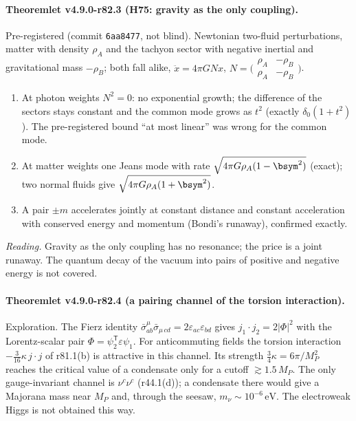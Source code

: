 \paragraph{Theoremlet v4.9.0-r82.3 (H75: gravity as the only coupling).}
Pre-registered (commit \texttt{6aa8477}, not blind).  Newtonian two-fluid perturbations, matter with density \(\rho_A\) and the tachyon
sector with negative inertial and gravitational mass \(-\rho_B\); both fall alike, \(\ddot x=4\pi G N x\),
\(N=\bigl(\begin{smallmatrix}\rho_A&-\rho_B\\\rho_A&-\rho_B\end{smallmatrix}\bigr)\).
\begin{enumerate}[leftmargin=2em]
\item[(a)] At photon weights \(N^2=0\): no exponential growth; the difference of the sectors stays constant and the common mode grows
as \(t^2\) (exactly \(\delta_0(1+t^2)\)).  The pre-registered bound ``at most linear'' was wrong for the common mode.
\item[(b)] At matter weights one Jeans mode with rate \(\sqrt{4\pi G\rho_A(1-\bsym^2)}\) (exact); two normal fluids give
\(\sqrt{4\pi G\rho_A(1+\bsym^2)}\).
\item[(c)] A pair \(\pm m\) accelerates jointly at constant distance and constant acceleration with conserved energy and momentum
(Bondi's runaway), confirmed exactly.
\end{enumerate}
\emph{Reading.}  Gravity as the only coupling has no resonance; the price is a joint runaway.  The quantum decay of the vacuum into
pairs of positive and negative energy is not covered.

\paragraph{Theoremlet v4.9.0-r82.4 (a pairing channel of the torsion interaction).}
Exploration.  The Fierz identity \(\bar\sigma^\mu_{ab}\bar\sigma_{\mu\,cd}=2\varepsilon_{ac}\varepsilon_{bd}\) gives
\(j_1\cdot j_2=2|\Phi|^2\) with the Lorentz-scalar pair \(\Phi=\psi_2^{\mathsf T}\varepsilon\psi_1\).  For anticommuting fields the
torsion interaction \(-\tfrac3{16}\kappa\,j\cdot j\) of r81.1(b) is attractive in this channel.  Its strength \(\tfrac34\kappa=6\pi/M_P^2\)
reaches the critical value of a condensate only for a cutoff \(\gtrsim1.5\,M_P\).  The only gauge-invariant channel is \(\nu^c\nu^c\)
(r44.1(d)); a condensate there would give a Majorana mass near \(M_P\) and, through the seesaw, \(m_\nu\sim10^{-6}\,\mathrm{eV}\).  The
electroweak Higgs is not obtained this way.

